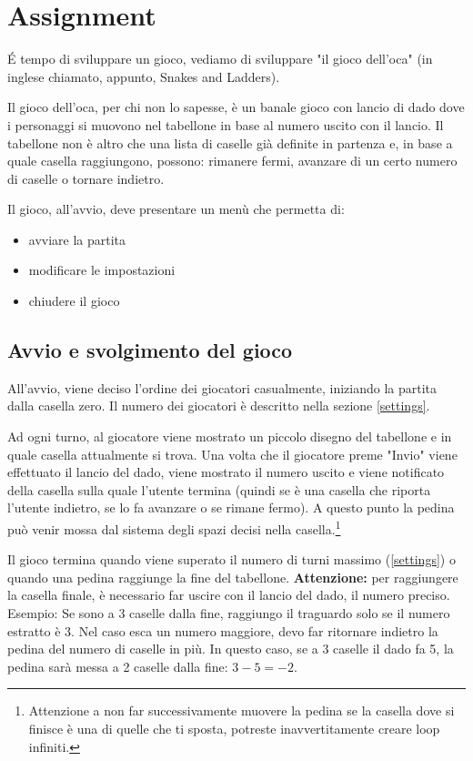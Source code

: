 \documentclass[addpoints]{exam}
\begin{document}
    \section{Assignment}
    É tempo di sviluppare un gioco, vediamo di sviluppare "il gioco dell'oca" (in inglese chiamato, appunto, Snakes and Ladders).

    Il gioco dell'oca, per chi non lo sapesse, è un banale gioco con lancio di dado dove i personaggi si muovono nel tabellone in base al numero uscito con il lancio. Il tabellone non è altro che una lista di caselle già definite in partenza\footnotemark{} e, in base a quale casella raggiungono, possono: rimanere fermi, avanzare di un certo numero di caselle o tornare indietro. 

    Il gioco, all'avvio, deve presentare un menù che permetta di:
    \begin{itemize}
        \item avviare la partita
        \item modificare le impostazioni
        \item chiudere il gioco
    \end{itemize}

    \subsection{Avvio e svolgimento del gioco}
    \label{game_boot}
    All'avvio, viene deciso l'ordine dei giocatori casualmente, iniziando la partita dalla casella zero. Il numero dei giocatori è descritto nella sezione \ref{settings}.

    Ad ogni turno, al giocatore viene mostrato un piccolo disegno del tabellone e in quale casella attualmente si trova. Una volta che il giocatore preme "Invio" viene effettuato il lancio del dado, viene mostrato il numero uscito e viene notificato della casella sulla quale l'utente termina (quindi se è una casella che riporta l'utente indietro, se lo fa avanzare o se rimane fermo). A questo punto la pedina può venir mossa dal sistema degli spazi decisi nella casella.\footnote{Attenzione a non far successivamente muovere la pedina se la casella dove si finisce è una di quelle che ti sposta, potreste inavvertitamente creare loop infiniti.}
    
    Il gioco termina quando viene superato il numero di turni massimo (\ref{settings}) o quando una pedina raggiunge la fine del tabellone. \textbf{Attenzione:} per raggiungere la casella finale, è necessario far uscire con il lancio del dado, il numero preciso. Esempio: Se sono a 3 caselle dalla fine, raggiungo il traguardo solo se il numero estratto è 3. Nel caso esca un numero maggiore, devo far ritornare indietro la pedina del numero di caselle in più. In questo caso, se a 3 caselle il dado fa 5, la pedina sarà messa a 2 caselle dalla fine: $3-5 = -2$.
\end{document}
